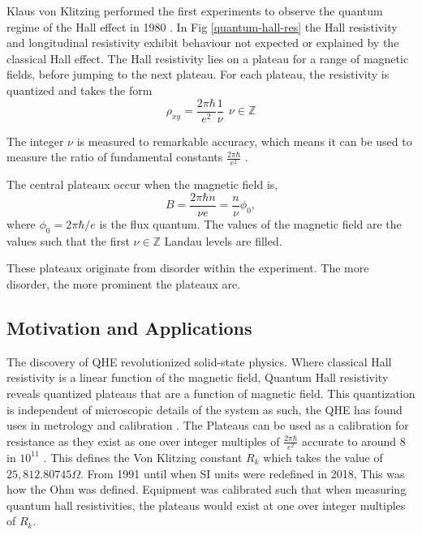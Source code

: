 Klaus von Klitzing performed the first experiments to observe the quantum regime of the Hall effect in 1980 \cite{klitz_method}. In Fig \ref{quantum-hall-res} the Hall resistivity and longitudinal resistivity exhibit behaviour not expected or explained by the classical Hall effect. The Hall resistivity lies on a plateau for a range of magnetic fields, before jumping to the next plateau. For each plateau, the resistivity is quantized and takes the form
\begin{equation}
    \rho_{xy}= \frac{2 \pi \hbar}{e^2} \frac{1}{\nu} \ \ \nu  \in \mathbb{Z}
\end{equation}

The integer $\nu$ is measured to remarkable accuracy, which means it can be used to measure the ratio of fundamental constants $\frac{2 \pi \hbar}{e^2}$ \cite{qhe-res}.

The central plateaux occur when the magnetic field is,
\begin{equation}
    B = \frac{2 \pi \hbar n}{\nu e} = \frac{n}{\nu} \phi_{0},
\end{equation}
where $\phi_{0}= 2 \pi \hbar / e$ is the flux quantum. The values of the magnetic field are the values such that the first $\nu  \in  \mathbb{Z}$ Landau levels are filled.

These plateaux originate from disorder within the experiment. The more disorder, the more prominent the plateaux are. 


\subsection{Motivation and Applications}

The discovery of QHE revolutionized solid-state physics. Where classical Hall resistivity is a linear function of the magnetic field, Quantum Hall resistivity reveals quantized plateaus that are a function of magnetic field. This quantization is independent of microscopic details of the system as such, the QHE has found uses in metrology and calibration \cite{Metrology}. The Plateaus can be used as a calibration for resistance as they exist as one over integer multiples of $\frac{2 \pi \hbar}{e^2}$ accurate to around 8 in $10^{11}$ \cite{doi:10.1063/1.2776371}. This defines the Von Klitzing constant $R_k$ which takes the value of $25,812.80745\Omega$. From 1991 until
when SI units were redefined in 2018, This was how the Ohm was defined. Equipment was calibrated such that when measuring quantum hall resistivities, the plateaus would exist at one over integer multiples of $R_k$. 

